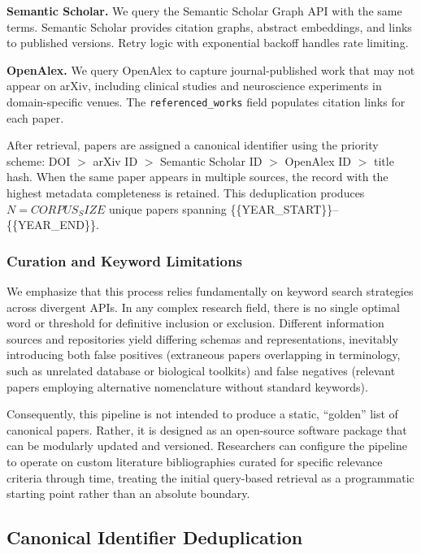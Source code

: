 \documentclass[
]{article}
\begin{document}
\textbf{Semantic Scholar.} We query the Semantic Scholar Graph API
\citep{kinney2023semantic} with the same terms. Semantic Scholar
provides citation graphs, abstract embeddings, and links to published
versions. Retry logic with exponential backoff handles rate limiting.

\textbf{OpenAlex.} We query OpenAlex \citep{priem2022openalex} to
capture journal-published work that may not appear on arXiv, including
clinical studies and neuroscience experiments in domain-specific venues.
The \texttt{referenced\_works} field populates citation links for each
paper.

After retrieval, papers are assigned a canonical identifier using the
priority scheme: DOI \(>\) arXiv ID \(>\) Semantic Scholar ID \(>\)
OpenAlex ID \(>\) title hash. When the same paper appears in multiple
sources, the record with the highest metadata completeness is retained.
This deduplication produces \(N = {{CORPUS_SIZE}}\) unique papers
spanning \{\{YEAR\_START\}\}--\{\{YEAR\_END\}\}.

\subsubsection{Curation and Keyword
Limitations}\label{curation-and-keyword-limitations}

We emphasize that this process relies fundamentally on keyword search
strategies across divergent APIs. In any complex research field, there
is no single optimal word or threshold for definitive inclusion or
exclusion. Different information sources and repositories yield
differing schemas and representations, inevitably introducing both false
positives (extraneous papers overlapping in terminology, such as
unrelated database or biological toolkits) and false negatives (relevant
papers employing alternative nomenclature without standard keywords).

Consequently, this pipeline is not intended to produce a static,
``golden'' list of canonical papers. Rather, it is designed as an
open-source software package that can be modularly updated and
versioned. Researchers can configure the pipeline to operate on custom
literature bibliographies curated for specific relevance criteria
through time, treating the initial query-based retrieval as a
programmatic starting point rather than an absolute boundary.

\subsection{Canonical Identifier
Deduplication}\label{canonical-identifier-deduplication}
\end{document}
